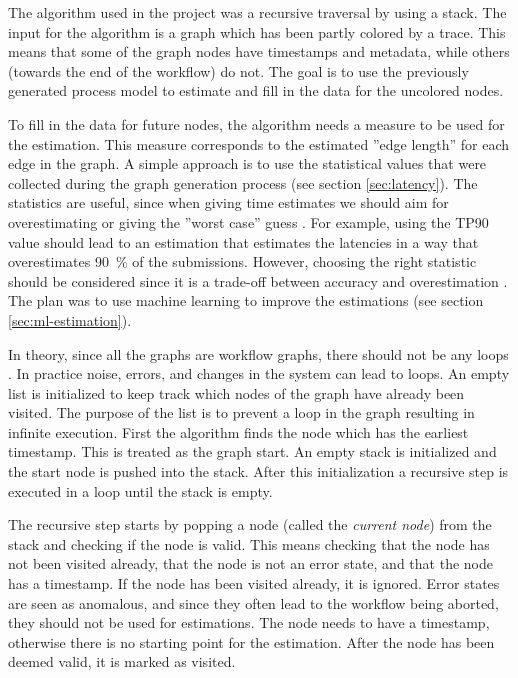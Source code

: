 The algorithm used in the project was a recursive traversal by using a stack.
The input for the algorithm is a graph which has been partly colored by a trace.
This means that some of the graph nodes have timestamps and metadata, while others (towards the end of the workflow) do not.
The goal is to use the previously generated process model to estimate
and fill in the data for the uncolored nodes.

To fill in the data for future nodes, the algorithm needs a measure to be used for the estimation. 
This measure corresponds to the estimated ''edge length'' for each edge in the graph.
A simple approach is to use the statistical values that were collected during the graph generation process (see section \ref{sec:latency}).
The statistics are useful, since when giving time estimates we should aim for overestimating or giving the ''worst case'' guess .
For example, using the TP90 value should lead to an estimation that estimates the latencies in a way that overestimates 90~\% of the submissions.
However, choosing the right statistic should be considered since it is a trade-off between accuracy and overestimation .
The plan was to use machine learning to improve the estimations (see section \ref{sec:ml-estimation}).


In theory, since all the graphs are workflow graphs, there should not be any loops . 
In practice noise, errors, and changes in the system can lead to loops.
An empty list is initialized to keep track which nodes of the graph have already been visited.
The purpose of the list is to prevent a loop in the graph resulting in infinite execution.
First the algorithm finds the node which has the earliest timestamp.
This is treated as the graph start.
An empty stack is initialized and the start node is pushed into the stack.
After this initialization a recursive step is executed in a loop until the stack is empty.

The recursive step starts by popping a node (called the \emph{current node}) from the stack and checking if the node is valid.
This means checking that the node has not been visited already, that the node is not an error state, and that the node has a timestamp.
If the node has been visited already, it is ignored.
Error states are seen as anomalous, and since they often lead to the workflow being aborted, they should not be used for estimations.
The node needs to have a timestamp, otherwise there is no starting point for the estimation.
After the node has been deemed valid, it is marked as visited.

